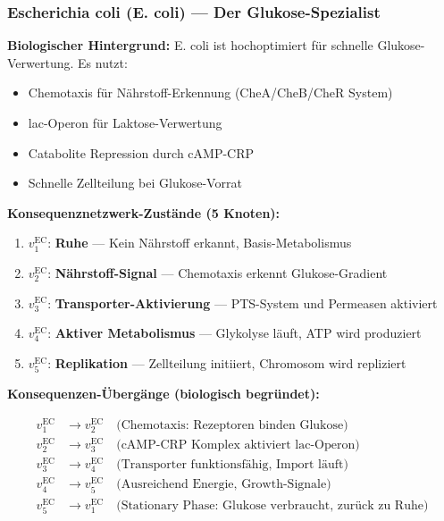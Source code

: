 \documentclass[a4paper,12pt]{article}
\theoremstyle{definition}
\begin{document}
\subsubsection*{Escherichia coli (E. coli) --- Der Glukose-Spezialist}

\textbf{Biologischer Hintergrund:}
E. coli ist hochoptimiert für schnelle Glukose-Verwertung. Es nutzt:
\begin{itemize}
    \item Chemotaxis für Nährstoff-Erkennung (CheA/CheB/CheR System)
    \item lac-Operon für Laktose-Verwertung
    \item Catabolite Repression durch cAMP-CRP
    \item Schnelle Zellteilung bei Glukose-Vorrat
\end{itemize}

\textbf{Konsequenznetzwerk-Zustände (5 Knoten):}

\begin{enumerate}
    \item $v_1^{\text{EC}}$: \textbf{Ruhe} --- Kein Nährstoff erkannt, Basis-Metabolismus
    \item $v_2^{\text{EC}}$: \textbf{Nährstoff-Signal} --- Chemotaxis erkennt Glukose-Gradient
    \item $v_3^{\text{EC}}$: \textbf{Transporter-Aktivierung} --- PTS-System und Permeasen aktiviert
    \item $v_4^{\text{EC}}$: \textbf{Aktiver Metabolismus} --- Glykolyse läuft, ATP wird produziert
    \item $v_5^{\text{EC}}$: \textbf{Replikation} --- Zellteilung initiiert, Chromosom wird repliziert
\end{enumerate}

\textbf{Konsequenzen-Übergänge (biologisch begründet):}

\begin{align*}
v_1^{\text{EC}} &\to v_2^{\text{EC}} \quad \text{(Chemotaxis: Rezeptoren binden Glukose)} \\
v_2^{\text{EC}} &\to v_3^{\text{EC}} \quad \text{(cAMP-CRP Komplex aktiviert lac-Operon)} \\
v_3^{\text{EC}} &\to v_4^{\text{EC}} \quad \text{(Transporter funktionsfähig, Import läuft)} \\
v_4^{\text{EC}} &\to v_5^{\text{EC}} \quad \text{(Ausreichend Energie, Growth-Signale)} \\
v_5^{\text{EC}} &\to v_1^{\text{EC}} \quad \text{(Stationary Phase: Glukose verbraucht, zurück zu Ruhe)}
\end{align*}
\end{document}

